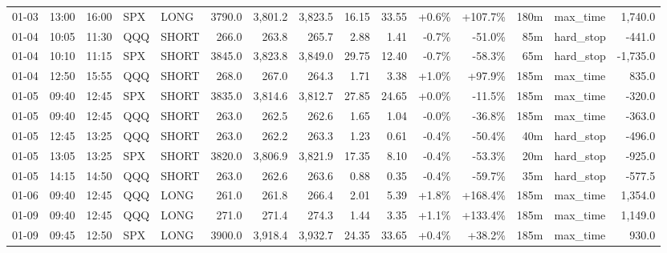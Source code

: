 \documentclass[11pt,a4paper,twoside]{article}
\begin{document}
\begin{landscape}
\begin{center}
\begin{longtable}{>{\color{txtmain}}l l l l l r r r r r r r r >{\color{txtmain}}l r}
01-03 & 13:00 & 16:00 & SPX & LONG & 3790.0 & 3,801.2 & 3,823.5 & 16.15 & 33.55 & \textcolor{wingreen}{+0.6\%} & \textcolor{wingreen}{+107.7\%} & 180m & max\_time & \textcolor{wingreen}{1,740.0} \\
01-04 & 10:05 & 11:30 & QQQ & SHORT & 266.0 & 263.8 & 265.7 & 2.88 & 1.41 & \textcolor{lossred}{-0.7\%} & \textcolor{lossred}{-51.0\%} & 85m & hard\_stop & \textcolor{lossred}{-441.0} \\
01-04 & 10:10 & 11:15 & SPX & SHORT & 3845.0 & 3,823.8 & 3,849.0 & 29.75 & 12.40 & \textcolor{lossred}{-0.7\%} & \textcolor{lossred}{-58.3\%} & 65m & hard\_stop & \textcolor{lossred}{-1,735.0} \\
01-04 & 12:50 & 15:55 & QQQ & SHORT & 268.0 & 267.0 & 264.3 & 1.71 & 3.38 & \textcolor{wingreen}{+1.0\%} & \textcolor{wingreen}{+97.9\%} & 185m & max\_time & \textcolor{wingreen}{835.0} \\
01-05 & 09:40 & 12:45 & SPX & SHORT & 3835.0 & 3,814.6 & 3,812.7 & 27.85 & 24.65 & \textcolor{wingreen}{+0.0\%} & \textcolor{lossred}{-11.5\%} & 185m & max\_time & \textcolor{lossred}{-320.0} \\
01-05 & 09:40 & 12:45 & QQQ & SHORT & 263.0 & 262.5 & 262.6 & 1.65 & 1.04 & \textcolor{lossred}{-0.0\%} & \textcolor{lossred}{-36.8\%} & 185m & max\_time & \textcolor{lossred}{-363.0} \\
01-05 & 12:45 & 13:25 & QQQ & SHORT & 263.0 & 262.2 & 263.3 & 1.23 & 0.61 & \textcolor{lossred}{-0.4\%} & \textcolor{lossred}{-50.4\%} & 40m & hard\_stop & \textcolor{lossred}{-496.0} \\
01-05 & 13:05 & 13:25 & SPX & SHORT & 3820.0 & 3,806.9 & 3,821.9 & 17.35 & 8.10 & \textcolor{lossred}{-0.4\%} & \textcolor{lossred}{-53.3\%} & 20m & hard\_stop & \textcolor{lossred}{-925.0} \\
01-05 & 14:15 & 14:50 & QQQ & SHORT & 263.0 & 262.6 & 263.6 & 0.88 & 0.35 & \textcolor{lossred}{-0.4\%} & \textcolor{lossred}{-59.7\%} & 35m & hard\_stop & \textcolor{lossred}{-577.5} \\
01-06 & 09:40 & 12:45 & QQQ & LONG & 261.0 & 261.8 & 266.4 & 2.01 & 5.39 & \textcolor{wingreen}{+1.8\%} & \textcolor{wingreen}{+168.4\%} & 185m & max\_time & \textcolor{wingreen}{1,354.0} \\
01-09 & 09:40 & 12:45 & QQQ & LONG & 271.0 & 271.4 & 274.3 & 1.44 & 3.35 & \textcolor{wingreen}{+1.1\%} & \textcolor{wingreen}{+133.4\%} & 185m & max\_time & \textcolor{wingreen}{1,149.0} \\
01-09 & 09:45 & 12:50 & SPX & LONG & 3900.0 & 3,918.4 & 3,932.7 & 24.35 & 33.65 & \textcolor{wingreen}{+0.4\%} & \textcolor{wingreen}{+38.2\%} & 185m & max\_time & \textcolor{wingreen}{930.0} \\

\end{longtable}
\end{center}
\end{landscape}
\end{document}
